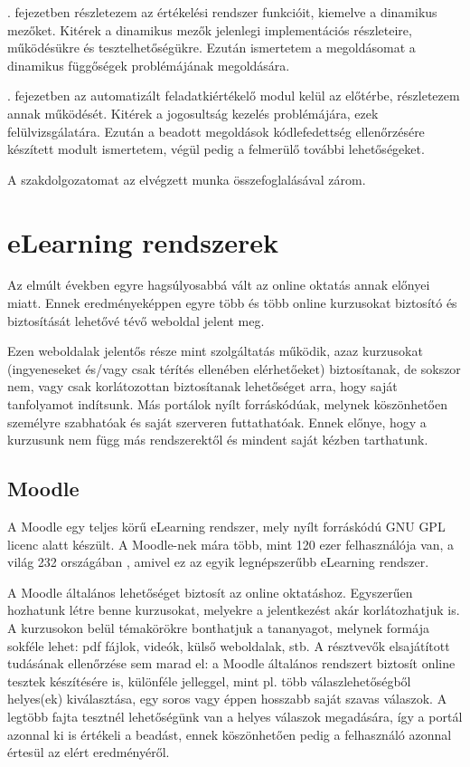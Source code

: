 . fejezetben részletezem az értékelési rendszer funkcióit, kiemelve a dinamikus mezőket. Kitérek a dinamikus mezők jelenlegi implementációs részleteire, működésükre és tesztelhetőségükre. Ezután ismertetem a megoldásomat a dinamikus függőségek problémájának megoldására.

. fejezetben az automatizált feladatkiértékelő modul kelül az előtérbe, részletezem annak működését. Kitérek a jogosultság kezelés problémájára, ezek felülvizsgálatára. Ezután a beadott megoldások kódlefedettség ellenőrzésére készített modult ismertetem, végül pedig a felmerülő további lehetőségeket.

A szakdolgozatomat az elvégzett munka összefoglalásával zárom.

\chapter{eLearning rendszerek}\label{chapter:othersystems}

Az elmúlt években egyre hagsúlyosabbá vált az online oktatás annak előnyei miatt. Ennek eredményeképpen egyre több és több online kurzusokat biztosító és biztosítását lehetővé tévő weboldal jelent meg. \cite{eLearningPopularity}

Ezen weboldalak jelentős része mint szolgáltatás működik, azaz kurzusokat (ingyeneseket és/vagy csak térítés ellenében elérhetőeket) biztosítanak, de sokszor nem, vagy csak korlátozottan biztosítanak lehetőséget arra, hogy saját tanfolyamot indítsunk. Más portálok nyílt forráskódúak, melynek köszönhetően személyre szabhatóak és saját szerveren futtathatóak. Ennek előnye, hogy a kurzusunk nem függ más rendszerektől és mindent saját kézben tarthatunk.

\section{Moodle}
A Moodle \cite{Moodle} egy teljes körű eLearning rendszer, mely nyílt forráskódú GNU GPL \cite{GNUGPL} licenc alatt készült. A Moodle-nek mára több, mint 120 ezer felhasználója van, a világ 232 országában \cite{MoodleStats}, amivel ez az egyik legnépszerűbb eLearning rendszer.

A Moodle általános lehetőséget biztosít az online oktatáshoz. Egyszerűen hozhatunk létre benne kurzusokat, melyekre a jelentkezést akár korlátozhatjuk is. A kurzusokon belül témakörökre bonthatjuk a tananyagot, melynek formája sokféle lehet: pdf fájlok, videók, külső weboldalak, stb. A résztvevők elsajátított tudásának ellenőrzése sem marad el: a Moodle általános rendszert biztosít online tesztek készítésére is, különféle jelleggel, mint pl. több válaszlehetőségből helyes(ek) kiválasztása, egy soros vagy éppen hosszabb saját szavas válaszok. A legtöbb fajta tesztnél lehetőségünk van a helyes válaszok megadására, így a portál azonnal ki is értékeli a beadást, ennek köszönhetően pedig a felhasználó azonnal értesül az elért eredményéről.

